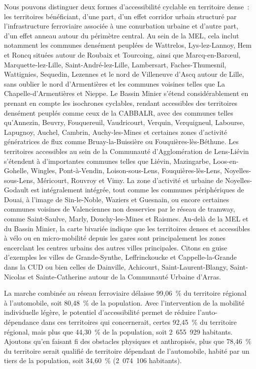 \begin{refsegment}
Nous pouvons distinguer deux formes d'accessibilité cyclable en territoire dense~: les territoires bénéficiant, d'une part, d'un effet corridor urbain \textcolor{blue}{\autocite[63-65]{liu_corridors_2016}} structuré par l'infrastructure ferroviaire associée à une conurbation urbaine et d'autre part, d'un effet anneau autour du périmètre central. Au sein de la \acrfull{MEL}, cela inclut notamment les communes densément peuplées de Wattrelos, Lys-lez-Lannoy, Hem et Roncq situées autour de Roubaix et Tourcoing, ainsi que Marcq-en-Barœul, Marquette-lez-Lille, Saint-André-lez-Lille, Lambersart, Faches-Thumesnil, Wattignies, Sequedin, Lezennes et le nord de Villeneuve d'Ascq autour de Lille, sans oublier le nord d'Armentières et les communes voisines telles que La Chapelle-d'Armentières et Nieppe. Le Bassin Minier s'étend considérablement en prenant en compte les isochrones cyclables, rendant accessibles des territoires densément peuplés comme ceux de la \acrfull{CABBALR}, avec des communes telles qu'Annezin, Beuvry, Fouquereuil, Vaudricourt, Verquin, Verquigneul, Labourse, Lapugnoy, Auchel, Cambrin, Auchy-les-Mines et certaines zones d'activité génératrices de flux comme Bruay-la-Buissière ou Fouquières-lès-Béthune. Les territoires accessibles au sein de la Communauté d'Agglomération de Lens-Liévin s'étendent à d'importantes communes telles que Liévin, Mazingarbe, Loos-en-Gohelle, Wingles, Pont-à-Vendin, Loison-sous-Lens, Fouquières-lès-Lens, Noyelles-sous-Lens, Méricourt, Rouvroy et Vimy. La zone d'activité et urbaine de Noyelles-Godault est intégralement intégrée, tout comme les communes périphériques de Douai, à l'image de Sin-le-Noble, Waziers et Guesnain, ou encore certaines communes voisines de Valenciennes non desservies par le réseau de tramway, comme Saint-Saulve, Marly, Douchy-les-Mines et Raismes. Au-delà de la \acrshort{MEL} et du Bassin Minier, la carte bivariée indique que les territoires denses et accessibles à vélo ou en micro-mobilité depuis les gares sont principalement les zones encerclant les centres urbains des autres villes principales. Citons en guise d'exemples les villes de Grande-Synthe, Leffrinckoucke et Cappelle-la-Grande dans la \acrfull{CUD} ou bien celles de Dainville, Achicourt, Saint-Laurent-Blangy, Saint-Nicolas et Sainte-Catherine autour de la Communauté Urbaine d'Arras.%

La marche combinée au réseau ferroviaire délaisse 99,06~\% du territoire régional à l'automobile, soit 80,48~\% de la population. Avec l'intervention de la mobilité individuelle légère, le potentiel d'accessibilité permet de réduire l'auto-dépendance dans ces territoires qui concernerait, certes 92,45~\% du territoire régional, mais plus que 44,30~\% de la population, soit 2~655~929 habitants. Ajoutons qu'en faisant fi des obstacles physiques et anthropisés, plus que 78,46~\% du territoire serait qualifié de territoire dépendant de l'automobile, habité par un tiers de la population, soit 34,60~\% (2~074~106 habitants).


\end{refsegment}
